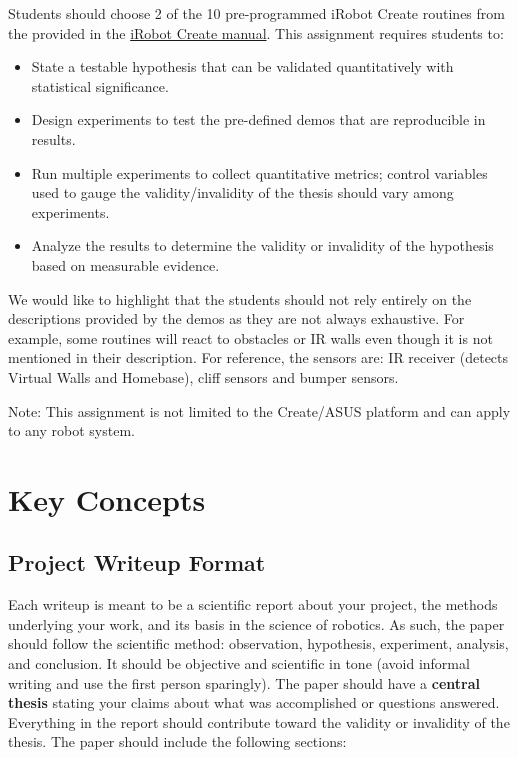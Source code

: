 Students should choose 2 of the 10 pre-programmed iRobot Create routines from the provided in the \href{http://www.irobot.com/filelibrary/create/Create\%20Manual_Final.pdf}{iRobot Create manual}. This assignment requires students to:\\
\begin{itemize}
\item State a testable hypothesis that can be validated quantitatively with statistical significance.
\item Design experiments to test the pre-defined demos that are reproducible in results.
\item Run multiple experiments to collect quantitative metrics; control variables used to gauge the validity/invalidity of the thesis should vary among experiments.
\item Analyze the results to determine the validity or invalidity of the hypothesis based on measurable evidence.
\end{itemize}

We would like to highlight that the students should not rely entirely on the descriptions provided by the demos as they are not always exhaustive. For example, some routines will react to obstacles or IR walls even though it is not mentioned in their description. For reference, the sensors are: IR receiver (detects Virtual Walls and Homebase), cliff sensors and bumper sensors.

Note: This assignment is not limited to the Create/ASUS platform and can apply to any robot system.

\section{Key Concepts}

\subsection{Project Writeup Format}

Each writeup is meant to be a scientific report about your project, the methods underlying your work, and its basis in the science of robotics.  As such, the paper should follow the scientific method:  observation, hypothesis, experiment, analysis, and conclusion.  It should be objective and scientific in tone (avoid informal writing and use the first person sparingly).  The paper should have a {\bf central thesis} stating your claims about what was accomplished or questions answered. Everything in the report should contribute toward the validity or invalidity of the thesis.  The paper should include the following sections:

